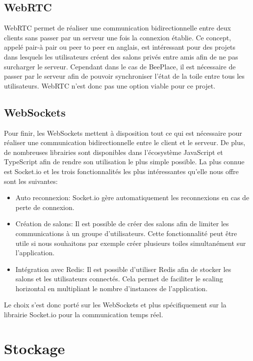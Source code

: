 \subsection{WebRTC}
WebRTC permet de réaliser une communication bidirectionnelle entre deux clients sans passer par un serveur une fois la connexion établie. Ce concept, appelé pair-à pair ou peer to peer en anglais, est intéressant pour des projets dans lesquels les utilisateurs créent des salons privés entre amis afin de ne pas surcharger le serveur. Cependant dans le cas de BeePlace, il est nécessaire de passer par le serveur afin de pouvoir synchroniser l'état de la toile entre tous les utilisateurs. WebRTC n'est donc pas une option viable pour ce projet.

\subsection{WebSockets}
Pour finir, les WebSockets mettent à disposition tout ce qui est nécessaire pour réaliser une communication bidirectionnelle entre le client et le serveur. De plus, de nombreuses librairies sont disponibles dans l'écosystème JavaScript et TypeScript afin de rendre son utilisation le plus simple possible. La plus connue est Socket.io et les trois fonctionnalités les plus intéressantes qu'elle nous offre sont les suivantes:

\begin{itemize}
  \item Auto reconnexion: Socket.io gère automatiquement les reconnexions en cas de perte de connexion.
  \item Création de salons: Il est possible de créer des salons afin de limiter les communications à un groupe d'utilisateurs. Cette fonctionnalité peut être utile si nous souhaitons par exemple créer plusieurs toiles simultanément sur l'application.
  \item Intégration avec Redis: Il est possible d'utiliser Redis afin de stocker les salons et les utilisateurs connectés. Cela permet de faciliter le scaling horizontal en multipliant le nombre d'instances de l'application.
\end{itemize}

Le choix s'est donc porté sur les WebSockets et plus spécifiquement sur la librairie Socket.io pour la communication temps réel.

\section{Stockage}

